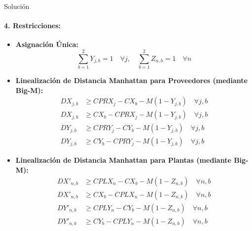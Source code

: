 \documentclass[11pt, a4paper]{article}
\begin{document}
\begin{ejercicio}{Solución}
  \paragraph{4. Restricciones:}
  \begin{itemize}
    \item \textbf{Asignación Única:}
    \begin{equation}
      \sum_{b=1}^{2} Y_{j,b} = 1 \quad \forall j, \quad \sum_{b=1}^{2} Z_{n,b} = 1 \quad \forall n
    \end{equation}
    \item \textbf{Linealización de Distancia Manhattan para Proveedores (mediante Big-M):}
    \begin{align}
      DX_{j,b} &\ge CPRX_j - CX_b - M(1 - Y_{j,b}) \quad \forall j, b \\
      DX_{j,b} &\ge CX_b - CPRX_j - M(1 - Y_{j,b}) \quad \forall j, b \\
      DY_{j,b} &\ge CPRY_j - CY_b - M(1 - Y_{j,b}) \quad \forall j, b \\
      DY_{j,b} &\ge CY_b - CPRY_j - M(1 - Y_{j,b}) \quad \forall j, b
    \end{align}
    \item \textbf{Linealización de Distancia Manhattan para Plantas (mediante Big-M):}
    \begin{align}
      DX'_{n,b} &\ge CPLX_n - CX_b - M(1 - Z_{n,b}) \quad \forall n, b \\
      DX'_{n,b} &\ge CX_b - CPLX_n - M(1 - Z_{n,b}) \quad \forall n, b \\
      DY'_{n,b} &\ge CPLY_n - CY_b - M(1 - Z_{n,b}) \quad \forall n, b \\
      DY'_{n,b} &\ge CY_b - CPLY_n - M(1 - Z_{n,b}) \quad \forall n, b
    \end{align}
  \end{itemize}

\end{ejercicio}

\newpage


\newpage
\end{document}
